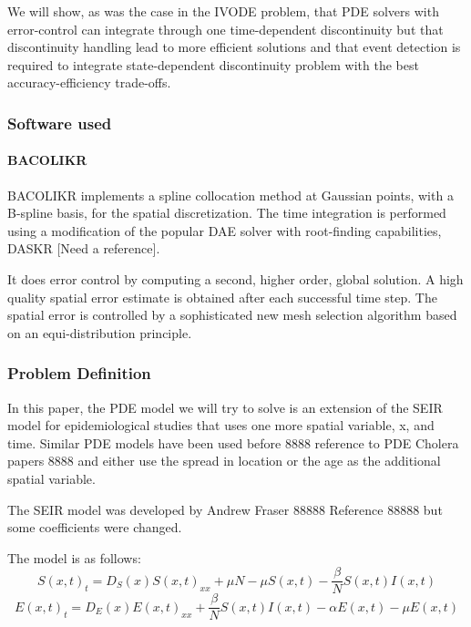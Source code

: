 \documentclass{article}
\begin{document}
We will show, as was the case in the IVODE problem, that PDE solvers with error-control can integrate through one time-dependent discontinuity but that discontinuity handling lead to more efficient solutions and that event detection is required to integrate state-dependent discontinuity problem with the best accuracy-efficiency trade-offs.

\subsubsection{Software used}
\label{subsection:pde_software}
\paragraph{BACOLIKR}
BACOLIKR implements a spline collocation method at Gaussian points, with a B-spline basis, for the spatial discretization. The time integration is performed using a modification of the popular DAE solver with root-finding capabilities, DASKR [Need a reference]. 

It does error control by computing a second, higher order, global solution. A high quality spatial error estimate is obtained after each successful time step. The spatial error is controlled by a sophisticated new mesh selection algorithm based on an equi-distribution principle.


\subsubsection{Problem Definition}
\label{subsection:pde_problem_def}
In this paper, the PDE model we will try to solve is an extension of the SEIR model for epidemiological studies that uses one more spatial variable, x, and time. Similar PDE models have been used before 8888 reference to PDE Cholera papers 8888 and either use the spread in location or the age as the additional spatial variable.

The SEIR model was developed by Andrew Fraser 88888 Reference 88888 but some coefficients were changed.

The model is as follows:
\begin{equation}
S(x, t)_t = D_S(x)S(x, t)_{xx} + \mu N - \mu S(x, t) - \frac{\beta}{N}S(x, t)I(x, t)
\end{equation}
\begin{equation}
E(x, t)_t = D_E(x)E(x, t)_{xx} + \frac{\beta}{N}S(x, t)I(x, t) - \alpha E(x, t) - \mu E(x, t)
\end{equation}
\end{document}
